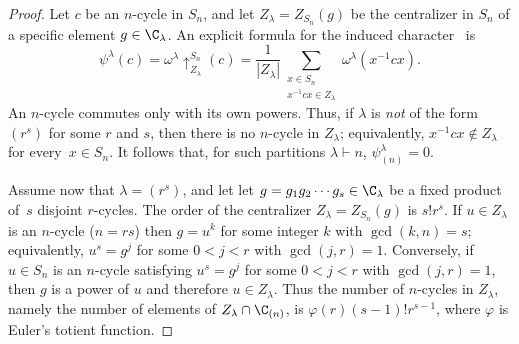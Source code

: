 \begin{proof}
    Let $c$ be an $n$-cycle in $S_n$, and let  $Z_\lambda = Z_{S_n}(g)$ be the centralizer in $S_n$ of a specific element $g\in \C_\lambda$. 
    An explicit formula for the induced character~\cite[(5.1)]{Isaacs} is
    \[
        \psi^\lambda(c)=\omega^\lambda\uparrow_{Z_\lambda}^{S_n}(c)=\frac{1}{|Z_\lambda|}\sum_{\substack{x\in S_n\\x^{-1}cx\in Z_\lambda}}\omega^\lambda(x^{-1}cx).
    \]
    An $n$-cycle commutes only with its own powers. Thus, if $\lambda$ is {\em not} of the form $(r^s)$ for some $r$ and $s$, 
    then there is no $n$-cycle in $Z_\lambda$;
    equivalently, $x^{-1}cx \not\in Z_\lambda$ for every~$x\in S_n$. 
    It follows that, for such partitions $\lambda \vdash n$, $\psi^\lambda_{(n)}=0$.

    Assume now that $\lambda= (r^s)$, and let let $g = g_1 g_2 \cdots g_s \in \C_\lambda$ be a fixed  product of~$s$ disjoint $r$-cycles. 
    The order of the centralizer 
    $Z_\lambda = Z_{S_n}(g)$ is $s!r^s$. 
    If $u \in Z_\lambda$ is an $n$-cycle ($n = rs$) then 
    $g = u^k$ for some integer $k$ with $\gcd(k,n) = s$;
    equivalently, $u^s = g^j$ for some $0 < j < r$ with $\gcd(j,r) = 1$.
    Conversely, if $u \in S_n$ is an $n$-cycle satisfying 
    $u^s = g^j$ for some $0 < j < r$ with $\gcd(j,r) = 1$, then $g$ is a power of $u$ and therefore $u \in Z_\lambda$.
    Thus the number of $n$-cycles in $Z_\lambda$, namely the number of elements of $Z_\lambda \cap \C_{(n)}$, is $\varphi(r) (s-1)! r^{s-1}$, where $\varphi$ is Euler's totient function. 


\end{proof}
